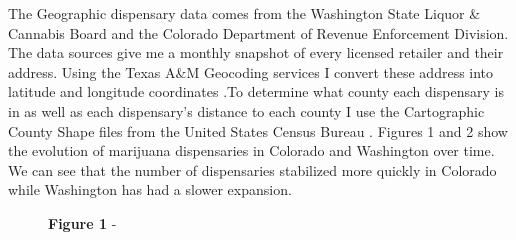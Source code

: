 \documentclass[11pt]{article}
\begin{document}
The Geographic dispensary data comes from the Washington State Liquor \& Cannabis Board and the Colorado Department of Revenue Enforcement Division. The data sources give me a monthly snapshot of every licensed retailer and their address. Using the Texas A\&M Geocoding services I convert these address into latitude and longitude coordinates \cite{tamu}.To determine what county each dispensary is in as well as each dispensary's distance to each county I use the Cartographic County Shape files from the United States Census Bureau \cite{branch_2018}. Figures 1 and 2 show the evolution of marijuana dispensaries in Colorado and Washington over time. We can see that the number of dispensaries stabilized more quickly in Colorado while Washington has had a slower expansion. \par


\begin{figure}[H]
	\centering
		\LARGE{\textbf{Figure 1}}
\newline
-
\end{figure}
\end{document}
